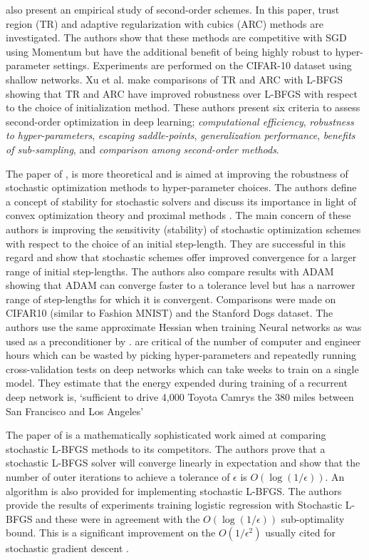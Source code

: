 \documentclass[11pt,twocolumn]{article}
\begin{document}
\citet{Xu:2ndNCML} also present an empirical study of second-order schemes. In this paper, trust region (TR) and adaptive regularization with cubics (ARC) methods are investigated. The authors show that these methods are competitive with SGD using Momentum but have the additional benefit of being highly robust to hyper-parameter settings. Experiments are performed on the CIFAR-10 dataset using shallow networks. Xu et al. make comparisons of TR and ARC with L-BFGS showing that TR and ARC have improved robustness over L-BFGS with respect to the  choice of initialization method. These authors present six criteria to assess second-order optimization in deep learning; \textit{computational efficiency}, \textit{robustness to hyper-parameters}, \textit{escaping saddle-points}, \textit{generalization performance}, \textit{benefits of sub-sampling}, and   \textit{comparison among second-order methods}.

The paper of \citet{Asi:BetterStoch}, is more theoretical and is aimed at improving the robustness of stochastic optimization methods to hyper-parameter choices. The authors define a concept of stability for stochastic solvers and discuss its importance in light of convex optimization theory and proximal methods \citep[see][]{Boyd:Vanden}. The main concern of these authors is improving the sensitivity (stability) of stochastic optimization schemes with respect to the choice of an initial step-length. They are successful in this regard and show that stochastic schemes offer improved convergence for a larger range of initial step-lengths. The authors also compare results with ADAM showing that ADAM can converge faster to a tolerance level but has a narrower range of step-lengths for which it is convergent. Comparisons were made on CIFAR10 (similar to Fashion MNIST) and the Stanford Dogs dataset. The authors use the same approximate Hessian when training Neural networks as was used as a preconditioner by \citet{Martens:Deep}.  \citet{Asi:BetterStoch} are critical of the number of computer and engineer hours which can be wasted by picking hyper-parameters and repeatedly running cross-validation tests on deep networks which can take weeks to train on a single model. They estimate that the energy expended during training of a recurrent deep network \cite{Collinsetal:RNN} is, `sufficient to drive 4,000 Toyota Camrys the 380 miles between San Francisco and Los Angeles'

The paper of \citet{Zhao:SLBFGS} is a mathematically sophisticated work aimed at comparing stochastic L-BFGS methods to its competitors. The authors prove that a stochastic L-BFGS solver will converge linearly in expectation and show that the number of outer iterations to achieve a tolerance of $\epsilon$ is $O(\log(1/\epsilon))$. An algorithm is also provided for implementing stochastic L-BFGS. The authors provide the results of experiments training logistic regression with Stochastic L-BFGS and these were in agreement with the  $O(\log(1/\epsilon))$ sub-optimality bound. This is a significant improvement on the $O(1/\epsilon^2)$ usually cited for stochastic gradient descent \citep[see][]{Srebro:StochOpt}.
\end{document}
